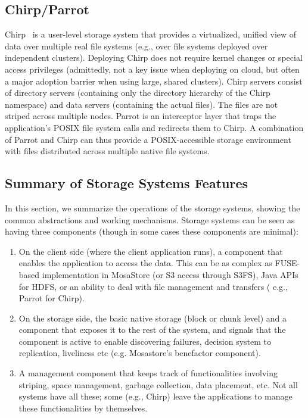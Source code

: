 \documentclass{sig-alternate}
\begin{document}
\subsection{Chirp/Parrot}
Chirp~\cite{chirp} is a user-level storage system that provides a virtualized,
unified view of data over multiple real file systems (e.g., over file systems
deployed over independent clusters). Deploying Chirp does not require kernel
changes or special access privileges (admittedly, not a key issue when
deploying on cloud, but often a major adoption barrier when using large, shared
clusters). Chirp servers consist of directory servers (containing only the
directory hierarchy of the Chirp name\-space) and data servers (containing the
actual files). The files are not striped across multiple nodes. Parrot is an
interceptor layer that traps the application's POSIX file system calls and
redirects them to Chirp. A combination of Parrot and Chirp can thus provide a
POSIX-accessible storage environment with files distributed across multiple
native file systems.

\subsection{Summary of Storage Systems Features}
In this section, we summarize the operations of the storage systems, showing
the common abstractions and working mechanisms. Storage systems can be seen as
having three components (though in some cases these components are minimal):

\begin{enumerate}
\item On the client side (where the client application runs), a component
    that enables the application to access the data.  This can be as complex as
    FUSE-based implementation in MosaStore (or S3 access through S3FS),
    Java APIs for HDFS, or an ability to deal with file
    management and transfers ( e.g., Parrot for Chirp).

\item On the storage side, the basic native storage (block or chunk level) and a
    component that exposes it to the rest of the system, and signals that the
    component is active to enable discovering failures, decision system to
    replication, liveliness etc (e.g. Mosastore's benefactor component). 

\item A management component that keeps track of functionalities involving
    striping, space management, garbage collection, data placement, etc.  Not
    all systems have all these; some (e.g., Chirp) leave the applications to
    manage these functionalities by themselves.
\end{enumerate}
\end{document}
